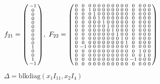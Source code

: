 \documentclass[fleqn]{article}
\begin{document}
$
f_{21} = \spmqty{ -1 \\ 0 \\ 0 \\ 0 \\ 0 \\ 0 \\ 0 \\ 0 \\ 0 \\ 0 \\ 1 \\ 0 \\ 0 \\ 1 \\ -1 },~
F_{22} = \spmqty{ 0 & 0 & 0 & 0 & 0 & 0 & 0 & 0 & 0 & 0 & 0 & 0 & 0 & 0 & 0 \\ 0 & 0 & 1 & 0 & 0 & 0 & 0 & 0 & 0 & 0 & 0 & 0 & 0 & 0 & 0 \\ 0 & 0 & 0 & 1 & 0 & 0 & 0 & 0 & 0 & 0 & 0 & 0 & 0 & 0 & 0 \\ 0 & 0 & 0 & 0 & 1 & 0 & 0 & 0 & 0 & 0 & 0 & 0 & 0 & 0 & 0 \\ 0 & 0 & 0 & 0 & 0 & 1 & 0 & 0 & 0 & 0 & 0 & 0 & 0 & 0 & 0 \\ 0 & 0 & 0 & 0 & 0 & 0 & 1 & 0 & 0 & 0 & 0 & 0 & 0 & 0 & 0 \\ 0 & 0 & 0 & 0 & 0 & 0 & 0 & 1 & 0 & 0 & 0 & 0 & 0 & 0 & 0 \\ 0 & 0 & 0 & 0 & 0 & 0 & 0 & 0 & 1 & 0 & 0 & 0 & 0 & 0 & 0 \\ 0 & 0 & 0 & 0 & 0 & 0 & 0 & 0 & 0 & 1 & 0 & 0 & 0 & 0 & 0 \\ 0 & 0 & 0 & 0 & 0 & 0 & 0 & 0 & 0 & 0 & 1 & 0 & 0 & 0 & 0 \\ 0 & -1 & 0 & 0 & 0 & 0 & 0 & 0 & 0 & 0 & 0 & 0 & 0 & 0 & 0 \\ 0 & 0 & 0 & 0 & 0 & 0 & 0 & 0 & 0 & 0 & 0 & 0 & 1 & 0 & 0 \\ 0 & 0 & 0 & 0 & 0 & 0 & 0 & 0 & 0 & 0 & 0 & 0 & 0 & 1 & 0 \\ 0 & 0 & 0 & 0 & 0 & 0 & 0 & 0 & 0 & 0 & 0 & -1 & 0 & 0 & 0 \\ 0 & 0 & 0 & 0 & 0 & 0 & 0 & 0 & 0 & 0 & 0 & 0 & 0 & 0 & 0 }
$

\bigskip

$\Delta = \mathrm{blkdiag}(x_1 I_{11}, x_2 I_4)$

\bigskip
\end{document}
